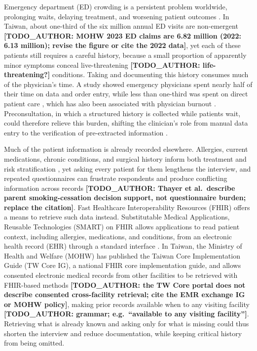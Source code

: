 \documentclass[lineno,pdflatex,sn-basic]{sn-jnl}%
\theoremstyle{thmstyleone}%
\theoremstyle{thmstyletwo}%
\theoremstyle{thmstylethree}%
\begin{document}
Emergency department (ED) crowding is a persistent problem worldwide, prolonging waits, delaying treatment, and worsening patient outcomes \citep{morleyEmergencyDepartmentCrowding2018}. In Taiwan, about one-third of the six million annual ED visits are non-emergent \citep{TongJiChuJiZhenJiuZhenTongJi2023,huangCharacteristicsNonEmergentVisits2019} \textbf{[TODO\_AUTHOR: MOHW 2023 ED claims are 6.82 million (2022: 6.13 million); revise the figure or cite the 2022 data]}, yet each of these patients still requires a careful history, because a small proportion of apparently minor symptoms conceal live-threatening \textbf{[TODO\_AUTHOR: life-threatening?]} conditions. Taking and documenting this history consumes much of the physician's time. A study showed emergency physicians spent nearly half of their time on data and order entry, while less than one-third was spent on direct patient care \citep{hill4000ClicksProductivity2013}, which has also been associated with physician burnout \citep{ghaseminejadOrganisationalFactorsAssociated2025}. Preconsultation, in which a structured history is collected while patients wait, could therefore relieve this burden, shifting the clinician's role from manual data entry to the verification of pre-extracted information \citep{eryilmazExtractingMedicalInformation2026}.

Much of the patient information is already recorded elsewhere. Allergies, current medications, chronic conditions, and surgical history inform both treatment and risk stratification \citep{sixChestPainEmergency2008}, yet asking every patient for them lengthens the interview, and repeated questionnaires can frustrate respondents and produce conflicting information across records \citep{thayerCombiningInternationalStandards2025} \textbf{[TODO\_AUTHOR: Thayer et al.\ describe parent smoking-cessation decision support, not questionnaire burden; replace the citation]}. Fast Healthcare Interoperability Resources (FHIR) offers a means to retrieve such data instead. Substitutable Medical Applications, Reusable Technologies (SMART) on FHIR allows applications to read patient context, including allergies, medications, and conditions, from an electronic health record (EHR) through a standard interface \citep{mandelSmartOnFhir2016}. In Taiwan, the Ministry of Health and Welfare (MOHW) has published the Taiwan Core Implementation Guide (TW Core IG), a national FHIR core implementation guide, and allows consented electronic medical records from other facilities to be retrieved with FHIR-based methods \citep{TaiWanHeXinShiZuoZhiYinZhuanQuTaiWanYiLiaoZiXunBiaoZhunDaPingTai} \textbf{[TODO\_AUTHOR: the TW Core portal does not describe consented cross-facility retrieval; cite the EMR exchange IG or MOHW policy]}, making prior records available when to any visiting facility \textbf{[TODO\_AUTHOR: grammar; e.g.\ ``available to any visiting facility'']}. Retrieving what is already known and asking only for what is missing could thus shorten the interview and reduce documentation, while keeping critical history from being omitted.
\end{document}
